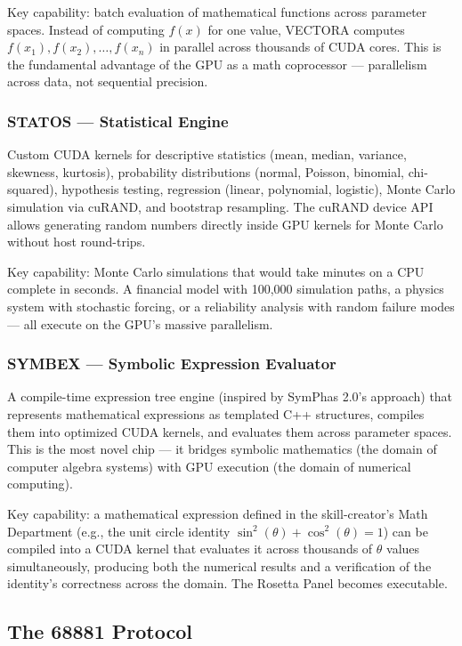 \documentclass[11pt,letterpaper]{article}
\begin{document}
Key capability: batch evaluation of mathematical functions across parameter spaces. Instead of computing $f(x)$ for one value, VECTORA computes $f(x_1), f(x_2), \ldots, f(x_n)$ in parallel across thousands of CUDA cores. This is the fundamental advantage of the GPU as a math coprocessor --- parallelism across data, not sequential precision.

\subsubsection{STATOS --- Statistical Engine}

Custom CUDA kernels for descriptive statistics (mean, median, variance, skewness, kurtosis), probability distributions (normal, Poisson, binomial, chi-squared), hypothesis testing, regression (linear, polynomial, logistic), Monte Carlo simulation via cuRAND, and bootstrap resampling. The cuRAND device API allows generating random numbers directly inside GPU kernels for Monte Carlo without host round-trips.

Key capability: Monte Carlo simulations that would take minutes on a CPU complete in seconds. A financial model with 100,000 simulation paths, a physics system with stochastic forcing, or a reliability analysis with random failure modes --- all execute on the GPU's massive parallelism.

\subsubsection{SYMBEX --- Symbolic Expression Evaluator}

A compile-time expression tree engine (inspired by SymPhas 2.0's approach) that represents mathematical expressions as templated C++ structures, compiles them into optimized CUDA kernels, and evaluates them across parameter spaces. This is the most novel chip --- it bridges symbolic mathematics (the domain of computer algebra systems) with GPU execution (the domain of numerical computing).

Key capability: a mathematical expression defined in the skill-creator's Math Department (e.g., the unit circle identity $\sin^2(\theta) + \cos^2(\theta) = 1$) can be compiled into a CUDA kernel that evaluates it across thousands of $\theta$ values simultaneously, producing both the numerical results and a verification of the identity's correctness across the domain. The Rosetta Panel becomes executable.

\subsection{The 68881 Protocol}
\end{document}
